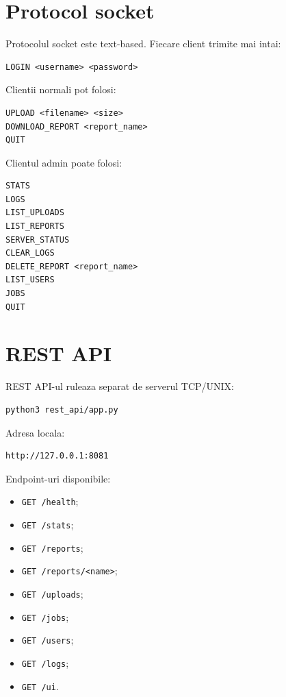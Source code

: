\documentclass[12pt,a4paper]{article}
\begin{document}
\section{Protocol socket}

Protocolul socket este text-based. Fiecare client trimite mai intai:

\begin{lstlisting}[style=code]
LOGIN <username> <password>
\end{lstlisting}

Clientii normali pot folosi:

\begin{lstlisting}[style=code]
UPLOAD <filename> <size>
DOWNLOAD_REPORT <report_name>
QUIT
\end{lstlisting}

Clientul admin poate folosi:

\begin{lstlisting}[style=code]
STATS
LOGS
LIST_UPLOADS
LIST_REPORTS
SERVER_STATUS
CLEAR_LOGS
DELETE_REPORT <report_name>
LIST_USERS
JOBS
QUIT
\end{lstlisting}

\section{REST API}

REST API-ul ruleaza separat de serverul TCP/UNIX:

\begin{lstlisting}[style=code]
python3 rest_api/app.py
\end{lstlisting}

Adresa locala:

\begin{lstlisting}[style=code]
http://127.0.0.1:8081
\end{lstlisting}

Endpoint-uri disponibile:

\begin{itemize}
    \item \texttt{GET /health};
    \item \texttt{GET /stats};
    \item \texttt{GET /reports};
    \item \texttt{GET /reports/<name>};
    \item \texttt{GET /uploads};
    \item \texttt{GET /jobs};
    \item \texttt{GET /users};
    \item \texttt{GET /logs};
    \item \texttt{GET /ui}.
\end{itemize}
\end{document}
